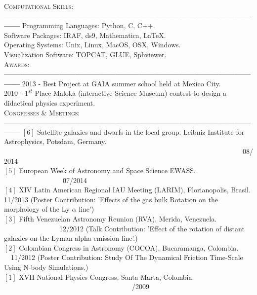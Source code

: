 \documentclass[letterpaper]{article}
\begin{document}
\textsc{\Large Computational Skills}:\\
{\bf---------------------------------------------------------------------------------------------------}
Programming Languages: Python, C, C++.\\
Software Packages: IRAF, ds9, Mathematica, \LaTeX.\\
Operating Systems: Unix, Linux, MacOS, OSX, Windows.\\
Visualization Software: TOPCAT, GLUE, Sphviewer.\\

\textsc{\Large Awards:}\\
{\bf---------------------------------------------------------------------------------------------------}
2013 - Best Project at GAIA summer school held at Mexico City.\\
2010 - $1^{st}$ Place Maloka (interactive Science Museum) contest to design a didactical physics experiment.\\ 

\textsc{\Large Congresses \& Meetings:}\\
{\bf---------------------------------------------------------------------------------------------------}
$\left[6\right]$ Satellite galaxies and dwarfs in the local group. Leibniz Institute for Astrophysics, Potsdam, Germany. \indent \indent \ \ \ \ \ \
\ \ \ \ \ \ \ \ \ \ \ \ \ \ \ \ \ \ \ \ \ \ \ \ \ \ \ \ \ \ \ \ \ \ \ \ \ \ \ \ \ \ \ \ \ \ \ \ \ \ \ \ \ \ \ \ \ \ \ \ \ \ \ 08/2014  \\
$\left[5\right]$ European Week of Astronomy and Space Science EWASS.  \indent \ \ \ \ \ \ \ \ \ \ \ \ \ \ \ \ \ 07/2014 \\
$\left[4\right]$ XIV Latin American Regional IAU Meeting (LARIM), Florianopolis, Brasil.  11/2013
\normalsize {(Poster Contribution: 'Effects of the gas bulk Rotation on the morphology of the Ly $\alpha$ line')}\\
$\left[3\right]$\large{ Fifth Venezuelan Astronomy Reunion (RVA), Merida, Venezuela. \indent \ \ \ \  \ \ \ \ \ \ \ \ \ \ \ \ 12/2012}
\normalsize{(Talk Contribution: 'Effect of the rotation of distant galaxies on the Lyman-alpha emission line'.)}\\
$\left[2\right]$\large{ Colombian Congress in Astronomy (COCOA), Bucaramanga, Colombia. \indent \ \ 11/2012} 
\normalsize{(Poster Contribution: Study Of The Dynamical Friction Time-Scale Using N-body Simulations.)}\\
$\left[1\right]$\large{ XVII National Physics Congress, Santa Marta, Colombia. \indent \ \ \ \ \ \ \ \ \ \ \ \ \ \ \ \ \  \ \ \ \ \ \ \ \ \ \ \ \ \ \ \ \ \ \ \ \   /2009}\\
\end{document}
